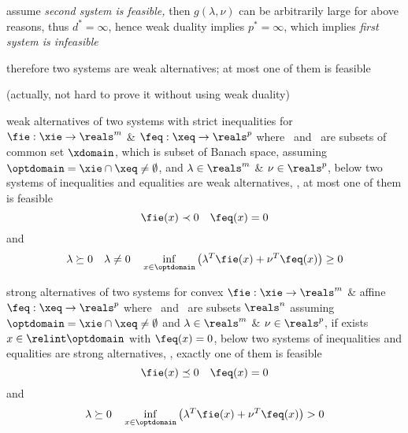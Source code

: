 \documentclass[17pt,landscape]{foils}
\begin{document}
{\vitem
	assume \emph{second system is feasible,}
	then
	$g(\lambda,\nu)$ can be arbitrarily large
	for above reasons,
	thus $d^\ast = \infty$,
	hence weak duality implies $p^\ast = \infty$,
	which implies
	\emph{first system is infeasible}\

\vitem
	therefore two systems are weak alternatives;
	at most one of them is feasible

\vitem []
	(actually, not hard to prove it without using weak duality)
\eit



\begin{mytheorem}{weak alternatives of two systems with strict inequalities}
	for $\fie: \xie\to\reals^m$ \& $\feq: \xeq\to\reals^p$
	where \xie\ and \xeq\ are subsets of common set $\xdomain$,
	which is subset of Banach space,
	assuming $\optdomain = \xie \cap \xeq \neq \emptyset$,
	and
	$\lambda\in\reals^m$ \& $\nu\in\reals^p$,
%
	below two systems of inequalities and equalities are weak alternatives,
	\ie, at most one of them is feasible
		$$
				\fie(x) \prec 0%
				\quad
				\feq(x) =0
		$$
		and
		$$
				\lambda \succeq 0%
				\quad
				\lambda\neq 0
				\quad
				\inf_{x\in\optdomain}
				\left(
					\lambda^T \fie(x) + \nu^T \feq(x)
				\right)
				\geq
				0
		$$
\end{mytheorem}



\begin{mytheorem}{strong alternatives of two systems}
	for convex $\fie: \xie\to\reals^m$ \& affine $\feq:\xeq\to\reals^p$
	where \xie\ and \xeq\ are subsets $\reals^n$
	assuming $\optdomain = \xie \cap \xeq \neq \emptyset$
	and
	$\lambda\in\reals^m$ \& $\nu\in\reals^p$,
	if exists $x \in \relint \optdomain$ with $\feq(x)=0$,
	below two systems of inequalities and equalities are strong alternatives,
	\ie, exactly one of them is feasible
		$$
				\fie(x) \preceq 0%
				\quad
				\feq(x) =0
		$$
		and
		$$
				\lambda \succeq 0%
				\quad
				\inf_{x\in\optdomain}
				\left(
					\lambda^T \fie(x) + \nu^T \feq(x)
				\right)
				>0
		$$
\end{mytheorem}



}
\end{document}
